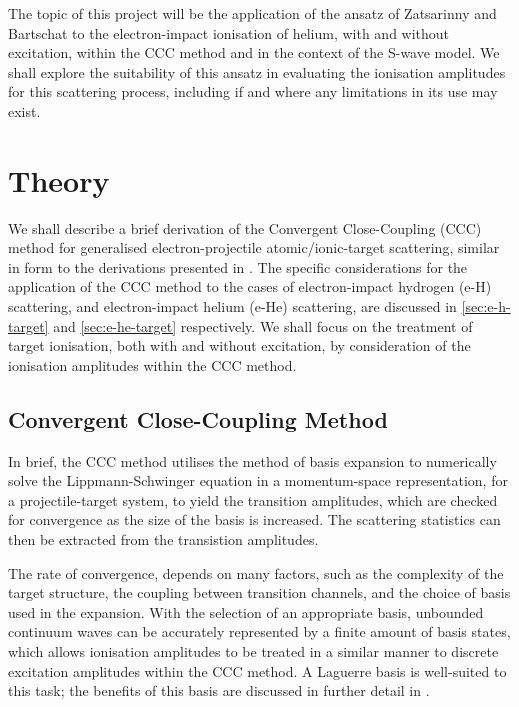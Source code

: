 \documentclass[draft]{article}
\begin{document}
The topic of this project will be the application of the ansatz of Zatsarinny
and Bartschat to the electron-impact ionisation of helium, with and without
excitation, within the CCC method and in the context of the S-wave model.
We shall explore the suitability of this ansatz in evaluating the ionisation
amplitudes for this scattering process, including if and where any limitations
in its use may exist.

\section{Theory}
\label{sec:theory}

We shall describe a brief derivation of the Convergent Close-Coupling (CCC)
method for generalised electron-projectile atomic/ionic-target scattering,
similar in form to the derivations presented in \cite{BRAY19951, AJP_BRAY1996}.
The specific considerations for the application of the CCC method to the cases
of electron-impact hydrogen (e-H) scattering, and electron-impact helium (e-He)
scattering, are discussed in \autoref{sec:e-h-target} and
\autoref{sec:e-he-target} respectively.
We shall focus on the treatment of target ionisation, both with and without
excitation, by consideration of the ionisation amplitudes within the CCC method.

\subsection{Convergent Close-Coupling Method}
\label{sec:ccc-method}

In brief, the CCC method utilises the method of basis expansion to numerically
solve the Lippmann-Schwinger equation in a momentum-space representation, for a
projectile-target system, to yield the transition amplitudes, which are checked
for convergence as the size of the basis is increased.
The scattering statistics can then be extracted from the transistion amplitudes.

The rate of convergence, depends on many factors, such as the complexity of the
target structure, the coupling between transition channels, and the choice of
basis used in the expansion.
With the selection of an appropriate basis, unbounded continuum waves can be
accurately represented by a finite amount of basis states, which allows
ionisation amplitudes to be treated in a similar manner to discrete excitation
amplitudes within the CCC method.
A Laguerre basis is well-suited to this task; the benefits of this basis are
discussed in further detail in \cite[5-9]{BRAY19951}.
\end{document}
